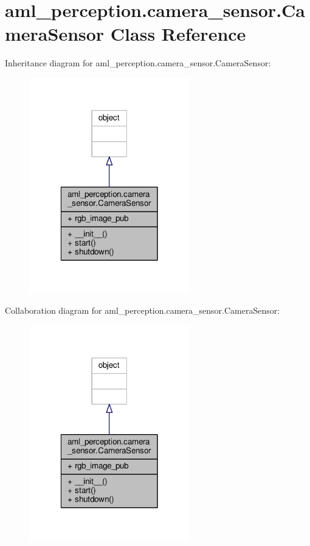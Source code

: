\hypertarget{classaml__perception_1_1camera__sensor_1_1_camera_sensor}{\section{aml\-\_\-perception.\-camera\-\_\-sensor.\-Camera\-Sensor Class Reference}
\label{classaml__perception_1_1camera__sensor_1_1_camera_sensor}
}


Inheritance diagram for aml\-\_\-perception.\-camera\-\_\-sensor.\-Camera\-Sensor\-:
\nopagebreak
\begin{figure}[H]
\begin{center}
\leavevmode
\includegraphics[width=198pt]{classaml__perception_1_1camera__sensor_1_1_camera_sensor__inherit__graph}
\end{center}
\end{figure}


Collaboration diagram for aml\-\_\-perception.\-camera\-\_\-sensor.\-Camera\-Sensor\-:
\nopagebreak
\begin{figure}[H]
\begin{center}
\leavevmode
\includegraphics[width=198pt]{classaml__perception_1_1camera__sensor_1_1_camera_sensor__coll__graph}
\end{center}
\end{figure}
